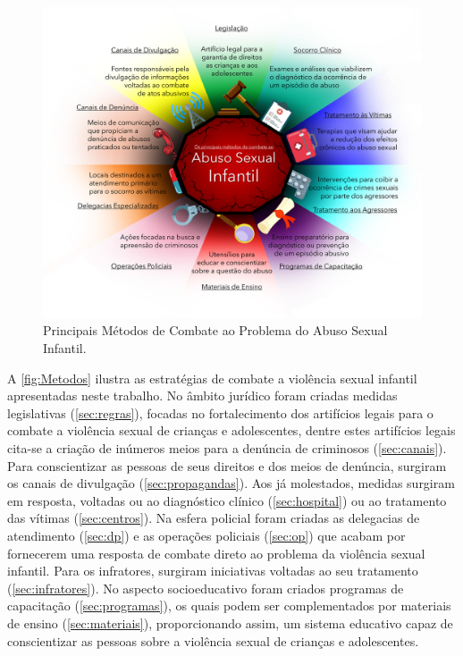 \begin{figure}[htb]
	\caption{\label{fig:Metodos}Principais Métodos de Combate ao Problema do Abuso Sexual Infantil.}\vspace{-0.4cm}
  \begin{adjustwidth}{-4.2cm}{-0.0cm}
    \includegraphics[scale=0.65]{./Visuais/MétodosCombate.pdf}
	\end{adjustwidth}\vspace{-1.0cm}
\end{figure}

A \autoref{fig:Metodos} ilustra as estratégias de combate a violência sexual infantil apresentadas neste trabalho. No âmbito jurídico foram criadas medidas legislativas (\autoref{sec:regras}), focadas no fortalecimento dos artifícios legais para o combate a violência sexual de crianças e adolescentes, dentre estes artifícios legais cita-se a criação de inúmeros meios para a denúncia de criminosos (\autoref{sec:canais}). Para conscientizar as pessoas de seus direitos e dos meios de denúncia, surgiram os canais de divulgação (\autoref{sec:propagandas}). Aos já molestados, medidas surgiram em resposta, voltadas ou ao diagnóstico clínico (\autoref{sec:hospital}) ou ao tratamento das vítimas (\autoref{sec:centros}). Na esfera policial foram criadas as delegacias de atendimento (\autoref{sec:dp}) e as operações policiais (\autoref{sec:op}) que acabam por fornecerem uma resposta de combate direto ao problema da violência sexual infantil. Para os infratores, surgiram iniciativas voltadas ao seu tratamento (\autoref{sec:infratores}). No aspecto socioeducativo foram criados programas de capacitação (\autoref{sec:programas}), os quais podem ser complementados por materiais de ensino (\autoref{sec:materiais}), proporcionando assim, um sistema educativo capaz de conscientizar as pessoas sobre a violência sexual de crianças e adolescentes. 

